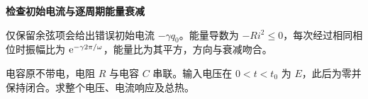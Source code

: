\begin{solution}
\par\medskip{}\noindent\textbf{检查初始电流与逐周期能量衰减}\par\nobreak
仅保留余弦项会给出错误初始电流 $-\gamma q_0$。能量导数为 $-Ri^2\le0$，每次经过相同相位时振幅比为 $\mathrm e^{-\gamma 2\pi/\omega}$，能量比为其平方，方向与衰减吻合。\end{solution}
\begin{question}\begin{example}[有限电压脉冲后的响应]\label{c5:example:14}
电容原不带电，电阻 $R$ 与电容 $C$ 串联。输入电压在 $0<t<t_0$ 为 $E$，此后为零并保持闭合。求整个电压、电流响应及总热。
\end{example}
\end{question}
